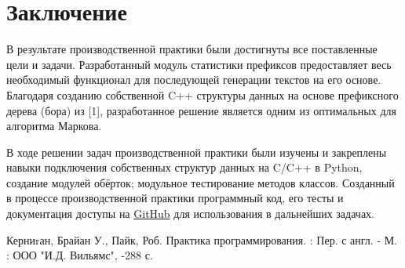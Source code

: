 \documentclass[a4paper,12pt]{article}
\begin{document}
\newpage
\section*{Заключение}
	В результате производственной практики были достигнуты все поставленные цели и задачи. Разработанный модуль статистики префиксов предоставляет весь необходимый функционал для последующей генерации текстов на его основе. Благодаря созданию собственной C++ структуры данных на основе префиксного дерева (бора) из [1], разработанное решение является одним из оптимальных для алгоритма Маркова. 

      В ходе решении задач производственной практики были изучены и закреплены навыки подключения собственных структур данных на C/C++ в Python, создание модулей обёрток; модульное тестирование методов классов. Созданный в процессе производственной практики программный код, его тесты и документация доступы на  \href{https://github.com/Flexagen/Construction-of-suffix-and-prefix-statistics}{GitHub} для использования в дальнейших задачах.

\newpage
{}
\begin{thebibliography}{}
	\bibitem{} {Керниrан, Брайан У., Пайк, Роб. Практика программирования. : Пер. с англ. - М. : ООО "И.Д. Вильямс", -288 с.}
\end{thebibliography}
\end{document}
